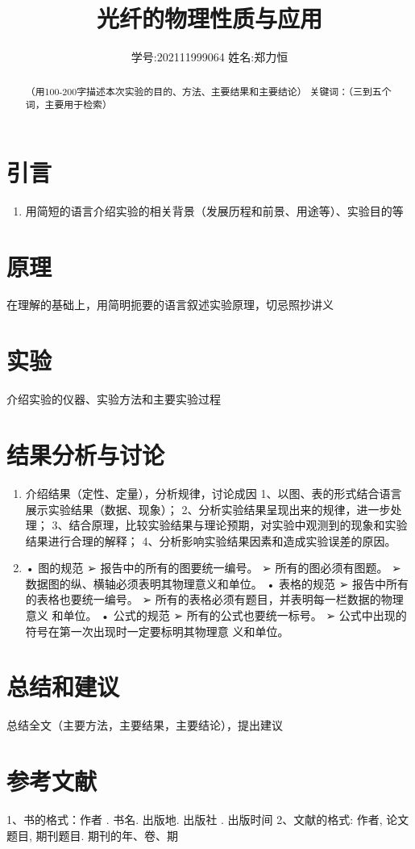 \documentclass[12pt,a4paper]{article}
\title{\vspace{-4cm}\Large 光纤的物理性质与应用}  %
\author{\kaishu 学号:202111999064 \hspace{2cm} 姓名:郑力恒}   %
\date{}
\begin{document}
\maketitle

\begin{abstract}
    （用100-200字描述本次实验的目的、方法、主要结果和主要结论） 
    关键词：（三到五个词，主要用于检索）
\end{abstract}

\section{引言}

\begin{enumerate}
\item 用简短的语言介绍实验的相关背景（发展历程和前景、用途等）、实验目的等
\end{enumerate}

\section{原理}
在理解的基础上，用简明扼要的语言叙述实验原理，切忌照抄讲义
\section{实验}
介绍实验的仪器、实验方法和主要实验过程
\section{结果分析与讨论}
\begin{enumerate}
    \item 介绍结果（定性、定量），分析规律，讨论成因
    1、以图、表的形式结合语言展示实验结果（数据、现象）；
    2、分析实验结果呈现出来的规律，进一步处理；
    3、结合原理，比较实验结果与理论预期，对实验中观测到的现象和实验结果进行合理的解释；
    4、分析影响实验结果因素和造成实验误差的原因。
    \item • 图的规范
    ➢ 报告中的所有的图要统一编号。
    ➢ 所有的图必须有图题。
    ➢ 数据图的纵、横轴必须表明其物理意义和单位。
    • 表格的规范
    ➢ 报告中所有的表格也要统一编号。
    ➢ 所有的表格必须有题目，并表明每一栏数据的物理意义
    和单位。
    • 公式的规范
    ➢ 所有的公式也要统一标号。
    ➢ 公式中出现的符号在第一次出现时一定要标明其物理意
    义和单位。
\end{enumerate}
\section{总结和建议}
总结全文（主要方法，主要结果，主要结论），提出建议
\section{参考文献}
1、书的格式：作者 . 书名. 出版地. 出版社 . 出版时间
2、文献的格式: 作者, 论文题目, 期刊题目. 期刊的年、卷、期
\end{document}
